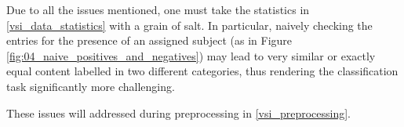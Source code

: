 \begin{tcolorbox}[colback=mylightblue,colframe=gray!50!black]
Due to all the issues mentioned, one must take the statistics in \headerName{} \ref{vsi_data_statistics} with a grain of salt. In particular, naively checking the entries for the presence of an assigned subject (as in Figure \ref{fig:04_naive_positives_and_negatives}) may lead to very similar or exactly equal content labelled in two different categories, thus rendering the classification task significantly more challenging. 
\end{tcolorbox}

These issues will addressed during preprocessing in \headerName{} \ref{vsi_preprocessing}.

\clearpage